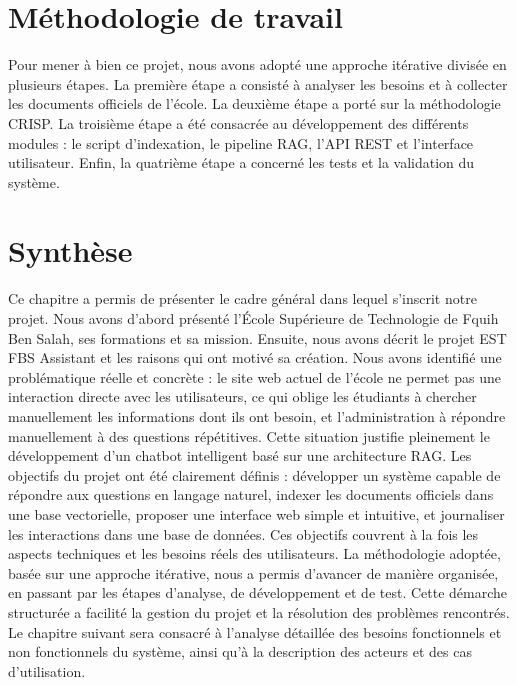 \documentclass[12pt,a4paper]{report}
\begin{document}
\section{Méthodologie de travail}
Pour mener à bien ce projet, nous avons adopté une approche itérative divisée en plusieurs étapes. La première étape a consisté à analyser les besoins et à collecter les documents officiels de l'école. La deuxième étape a porté sur la méthodologie CRISP. La troisième étape a été consacrée au développement des différents modules : le script d'indexation, le pipeline RAG, l'API REST et l'interface utilisateur. Enfin, la quatrième étape a concerné les tests et la validation du système.
\section{Synthèse}
Ce chapitre a permis de présenter le cadre général dans lequel s'inscrit notre projet. Nous avons d'abord présenté l'École Supérieure de Technologie de Fquih Ben Salah, ses formations et sa mission. Ensuite, nous avons décrit le projet EST FBS Assistant et les \newline  raisons qui ont motivé sa création.
Nous avons identifié une problématique réelle et concrète : le site web actuel de l'école ne permet pas une interaction directe avec les utilisateurs, ce qui oblige les étudiants à chercher manuellement les informations dont ils ont besoin, et l'administration à répondre manuellement à des questions répétitives. Cette situation justifie pleinement le développement d'un chatbot intelligent basé sur une \newline  architecture RAG.
Les objectifs du projet ont été clairement définis : développer un \newline  système capable de répondre aux questions en langage naturel, indexer les documents officiels dans une base vectorielle, proposer une interface web simple et intuitive, et \newline  journaliser les interactions dans une base de données. Ces objectifs couvrent à la fois les aspects techniques et les besoins réels des utilisateurs.
La méthodologie adoptée, basée sur une approche itérative, nous a permis d'avancer de manière organisée, en passant par les étapes d'analyse, de développement et de test. Cette démarche structurée a facilité la gestion du projet et la résolution des problèmes rencontrés.
Le chapitre suivant sera consacré à l'analyse détaillée des besoins fonctionnels et non fonctionnels du système, ainsi qu'à la description des acteurs et des cas d'utilisation.
\end{document}
